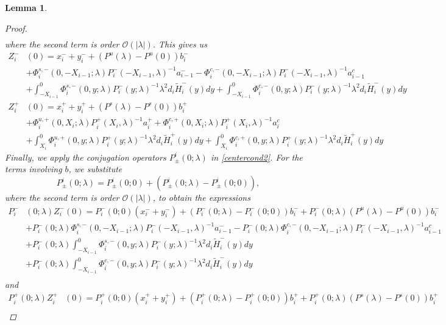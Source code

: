 \documentclass[10pt,reqno]{amsart}
\theoremstyle{plain}
\newtheorem{lemma}[theorem]{Lemma}
\theoremstyle{definition}
\theoremstyle{remark}
\numberwithin{theorem}{section}
\numberwithin{equation}{section}
\begin{document}
\begin{lemma}
\begin{proof}
\begin{align*}
\end{align*}
where the second term is order $\mathcal{O}(|\lambda|)$. This gives us
\begin{align*}
Z_i^-&(0) = x_i^- + y_i^- + (P^u(\lambda) - P^u(0))b_i^- \\
&+ \Phi_i^{s,-}(0, -X_{i-1}; \lambda) P_i^-(-X_{i-1}, \lambda)^{-1} a_{i-1}^- - \Phi_i^{c,-}(0, -X_{i-1}; \lambda) P_i^-(-X_{i-1}, \lambda)^{-1} a_{i-1}^c \\
&+ \int_{-X_{i-1}}^0 \Phi_i^{s,-}(0, y; \lambda) P_i^-(y; \lambda)^{-1} \lambda^2 d_i \tilde{H}_i^-(y) dy 
+ \int_{-X_{i-1}}^0 \Phi_i^{c,-}(0, y; \lambda) P_i^-(y; \lambda)^{-1} \lambda^2 d_i \tilde{H}_i^-(y) dy \\
Z_i^+&(0) = x_i^+ + y_i^+ + (P^s(\lambda) - P^s(0)) b_i^+ \\
&+\Phi_i^{u,+}(0, X_i; \lambda) P_i^+(X_i, \lambda)^{-1} a_i^+ + \Phi_i^{c,+}(0, X_i; \lambda) P_i^+(X_i, \lambda)^{-1} a_i^c \\
&+ \int_{X_i}^0 \Phi_i^{u,+}(0, y; \lambda) P_i^+(y; \lambda)^{-1} \lambda^2 d_i \tilde{H}_i^+(y) dy 
+ \int_{X_i}^0 \Phi_i^{c,+}(0, y; \lambda) P_i^+(y; \lambda)^{-1} \lambda^2 d_i \tilde{H}_i^+(y) dy 
\end{align*}
Finally, we apply the conjugation operators $P^i_\pm(0; \lambda)$ in \eqref{centercond2}. For the terms involving $b$, we substitute
\[
P^i_\pm(0; \lambda) = P^i_\pm(0; 0) + (P^i_\pm(0; \lambda) - P^i_\pm(0; 0)),
\]
where the second term is order $\mathcal{O}(|\lambda|)$, to obtain the expressions
\begin{align*}
P_i^-&(0; \lambda) Z_i^-(0) = P_i^-(0; 0)(x_i^- + y_i^-) + (P_i^-(0; \lambda) - P_i^-(0; 0))b_i^- + P_i^-(0; \lambda)(P^u(\lambda) - P^u(0))b_i^- \\
&+ P_i^-(0; \lambda) \Phi_i^{s,-}(0, -X_{i-1}; \lambda) P_i^-(-X_{i-1}, \lambda)^{-1} a_{i-1}^- - P_i^-(0; \lambda) \Phi_i^{c,-}(0, -X_{i-1}; \lambda) P_i^-(-X_{i-1}, \lambda)^{-1} a_{i-1}^c \\
&+ P_i^-(0; \lambda) \int_{-X_{i-1}}^0 \Phi_i^{s,-}(0, y; \lambda) P_i^-(y; \lambda)^{-1} \lambda^2 d_i \tilde{H}_i^-(y) dy \\
&+ P_i^-(0; \lambda) \int_{-X_{i-1}}^0 \Phi_i^{c,-}(0, y; \lambda) P_i^-(y; \lambda)^{-1} \lambda^2 d_i \tilde{H}_i^-(y) dy  \\
\end{align*}
and
\begin{align*}
P_i^+(0; \lambda) Z_i^+&(0) = P_i^+(0; 0)(x_i^+ + y_i^+) + (P_i^+(0; \lambda) - P_i^+(0; 0))b_i^+ + P_i^+(0; \lambda) (P^s(\lambda) - P^s(0)) b_i^+ \\

\end{align*}
\end{proof}
\end{lemma}
\end{document}

